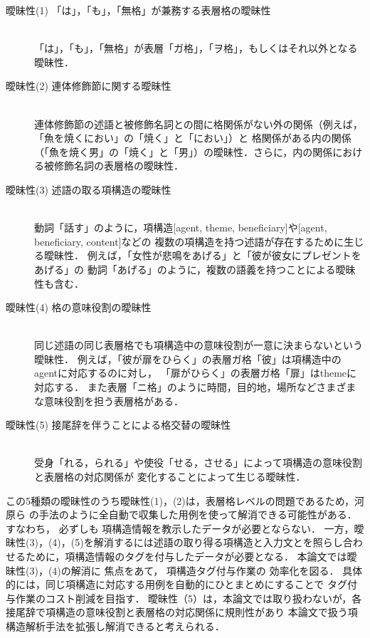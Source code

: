 \begin{description}
\item[曖昧性(1) 「は」，「も」，「無格\footnotemark」が兼務する表層格の曖昧性]　\\
「は」，「も」，「無格」が表層「ガ格」，「ヲ格」，もしくはそれ以外となる曖昧性．

\item[曖昧性(2) 連体修飾節に関する曖昧性]　\\
連体修飾節の述語と被修飾名詞との間に格関係がない外の関係（例えば，「魚を焼くにおい」の「焼く」と「におい」）と
格関係がある内の関係（「魚を焼く男」の「焼く」と「男」）の曖昧性．さらに，内の関係における被修飾名詞の表層格の曖昧性．

\item[曖昧性(3) 述語の取る項構造の曖昧性]　\\
動詞「話す」のように，項構造[agent, theme, beneficiary]や[agent, beneficiary, content]などの
複数の項構造を持つ述語が存在するために生じる曖昧性．
例えば，「女性が悲鳴をあげる」と「彼が彼女にプレゼントをあげる」の
動詞「あげる」のように，複数の語義を持つことによる曖昧性も含む．

\item[曖昧性(4) 格の意味役割の曖昧性]　\\
同じ述語の同じ表層格でも項構造中の意味役割が一意に決まらないという曖昧性．
例えば，「彼が扉をひらく」の表層ガ格「彼」は項構造中のagentに対応するのに対し，
「扉がひらく」の表層ガ格「扉」はthemeに対応する．
また表層「ニ格」のように時間，目的地，場所などさまざまな意味役割を担う表層格がある．

\item[曖昧性(5) 接尾辞を伴うことによる格交替の曖昧性]　\\
受身「れる，られる」や使役「せる，させる」によって項構造の意味役割と表層格の対応関係が
変化することによって生じる曖昧性．

\end{description}



この5種類の曖昧性のうち曖昧性(1)，(2)は，表層格レベルの問題であるため，河原ら\citeyear{kawahara:02:a}
の手法のように全自動で収集した用例を使って解消できる可能性がある．すなわち，
必ずしも
項構造情報を教示したデータが必要とならない．
一方，曖昧性(3)，(4)，(5)を解消するには述語の取り得る項構造と入力文とを照らし合わせるために，項構造情報のタグを付与したデータが必要となる．
本論文では曖昧性(3)，(4)の解消に
焦点をあて，
項構造タグ付与作業の
効率化を図る．
具体的には，同じ項構造に対応する用例を自動的にひとまとめにすることで
タグ付与作業のコスト削減を目指す．
曖昧性（5）は，本論文では取り扱わないが，各接尾辞で項構造の意味役割と表層格の対応関係に規則性があり
本論文で扱う項構造解析手法を拡張し解消できると考えられる．

